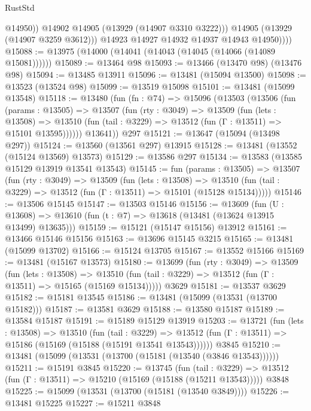 \begin{lexlean}{RustStd}
\begin{coremodule}
                    @14950))
                @14902
                @14905
                (@13929 (@14907 @3310 @3222)))
              @14905
              (@13929 (@14907 @3259 @3612)))
            @14923
            @14927
            @14932
            @14937
            @14943
            @14950))))
@15088 := @13975 (@14000 (@14041 (@14043 (@14045 (@14066 (@14089 @15081))))))
@15089 := @13464 @98
@15093 := @13466 (@13470 @98) (@13476 @98)
@15094 := @13485 @13911
@15096 := @13481 (@15094 @13500)
@15098 := @13523 (@13524 @98)
@15099 := @13519 @15098
@15101 := @13481 (@15099 @13548)
@15118 := @13480
    (fun (fn : @74) =>
    @15096
      (@13503
        (@13506
          (fun (params : @13505) =>
          @13507
            (fun (rty : @3049) =>
            @13509
              (fun (lets : @13508) =>
              @13510 (fun (tail : @3229) => @13512 (fun (Γ : @13511) => @15101 @13595))))))
        @13641))
    @297
@15121 := @13647 (@15094 (@13498 @297))
@15124 := @13560 (@13561 @297) @13915
@15128 := @13481 (@13552 (@15124 @13569) @13573)
@15129 := @13586 @297
@15134 := @13583 (@13585 @15129 @13919 @13541 @13543)
@15145 := fun (params : @13505) =>
  @13507
    (fun (rty : @3049) =>
    @13509
      (fun (lets : @13508) =>
      @13510 (fun (tail : @3229) => @13512 (fun (Γ : @13511) => @15101 (@15128 @15134)))))
@15146 := @13506 @15145
@15147 := @13503 @15146
@15156 := @13609
    (fun (U : @13608) => @13610 (fun (t : @7) => @13618 (@13481 (@13624 @13915 @13499) @13635)))
@15159 := @15121 (@15147 @15156) @13912
@15161 := @13466 @15146 @15156
@15163 := @13696 @15145 @3215
@15165 := @13481 (@15099 @13702)
@15166 := @15124 @13705
@15167 := @13552 @15166
@15169 := @13481 (@15167 @13573)
@15180 := @13699
    (fun (rty : @3049) =>
    @13509
      (fun (lets : @13508) =>
      @13510 (fun (tail : @3229) => @13512 (fun (Γ : @13511) => @15165 (@15169 @15134)))))
    @3629
@15181 := @13537 @3629
@15182 := @15181 @13545
@15186 := @13481 (@15099 (@13531 (@13700 @15182)))
@15187 := @13581 @3629
@15188 := @13580 @15187
@15189 := @13584 @15187
@15191 := @15189 @15129 @13919
@15203 := @13721
    (fun (lets : @13508) =>
    @13510
      (fun (tail : @3229) =>
      @13512 (fun (Γ : @13511) => @15186 (@15169 (@15188 (@15191 @13541 @13543))))))
    @3845
@15210 := @13481 (@15099 (@13531 (@13700 (@15181 (@13540 (@3846 @13543))))))
@15211 := @15191 @3845
@15220 := @13745
    (fun (tail : @3229) => @13512 (fun (Γ : @13511) => @15210 (@15169 (@15188 (@15211 @13543)))))
    @3848
@15225 := @15099 (@13531 (@13700 (@15181 (@13540 @3849))))
@15226 := @13481 @15225
@15227 := @15211 @3848

\end{coremodule}
\end{lexlean}
